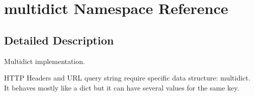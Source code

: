 \hypertarget{namespacemultidict}{}\section{multidict Namespace Reference}
\label{namespacemultidict}


\subsection{Detailed Description}
\begin{DoxyVerb}Multidict implementation.

HTTP Headers and URL query string require specific data structure:
multidict. It behaves mostly like a dict but it can have
several values for the same key.
\end{DoxyVerb}
 